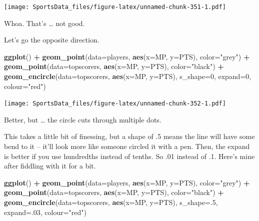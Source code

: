 \documentclass[
]{book}
\newenvironment{Shaded}{\begin{snugshade}}{\end{snugshade}}
\newcommand{\DataTypeTok}[1]{\textcolor[rgb]{0.13,0.29,0.53}{#1}}
\newcommand{\DecValTok}[1]{\textcolor[rgb]{0.00,0.00,0.81}{#1}}
\newcommand{\KeywordTok}[1]{\textcolor[rgb]{0.13,0.29,0.53}{\textbf{#1}}}
\newcommand{\NormalTok}[1]{#1}
\newcommand{\OperatorTok}[1]{\textcolor[rgb]{0.81,0.36,0.00}{\textbf{#1}}}
\newcommand{\StringTok}[1]{\textcolor[rgb]{0.31,0.60,0.02}{#1}}
\begin{document}
\texttt{[image: SportsData\_files/figure-latex/unnamed-chunk-351-1.pdf]}

Whoa. That's \ldots{} not good.

Let's go the opposite direction.

\begin{Shaded}
\begin{Highlighting}[]
\KeywordTok{ggplot}\NormalTok{() }\OperatorTok{+}\StringTok{ }
\StringTok{  }\KeywordTok{geom_point}\NormalTok{(}\DataTypeTok{data=}\NormalTok{players, }\KeywordTok{aes}\NormalTok{(}\DataTypeTok{x=}\NormalTok{MP, }\DataTypeTok{y=}\NormalTok{PTS), }\DataTypeTok{color=}\StringTok{"grey"}\NormalTok{) }\OperatorTok{+}\StringTok{ }
\StringTok{  }\KeywordTok{geom_point}\NormalTok{(}\DataTypeTok{data=}\NormalTok{topscorers, }\KeywordTok{aes}\NormalTok{(}\DataTypeTok{x=}\NormalTok{MP, }\DataTypeTok{y=}\NormalTok{PTS), }\DataTypeTok{color=}\StringTok{"black"}\NormalTok{) }\OperatorTok{+}\StringTok{ }
\StringTok{  }\KeywordTok{geom_encircle}\NormalTok{(}\DataTypeTok{data=}\NormalTok{topscorers, }\KeywordTok{aes}\NormalTok{(}\DataTypeTok{x=}\NormalTok{MP, }\DataTypeTok{y=}\NormalTok{PTS), }\DataTypeTok{s_shape=}\DecValTok{0}\NormalTok{, }\DataTypeTok{expand=}\DecValTok{0}\NormalTok{, }\DataTypeTok{colour=}\StringTok{"red"}\NormalTok{)}
\end{Highlighting}
\end{Shaded}

\texttt{[image: SportsData\_files/figure-latex/unnamed-chunk-352-1.pdf]}

Better, but \ldots{} the circle cuts through multiple dots.

This takes a little bit of finessing, but a shape of .5 means the line will have some bend to it -- it'll look more like someone circled it with a pen. Then, the expand is better if you use hundredths instead of tenths. So .01 instead of .1. Here's mine after fiddling with it for a bit.

\begin{Shaded}
\begin{Highlighting}[]
\KeywordTok{ggplot}\NormalTok{() }\OperatorTok{+}\StringTok{ }
\StringTok{  }\KeywordTok{geom_point}\NormalTok{(}\DataTypeTok{data=}\NormalTok{players, }\KeywordTok{aes}\NormalTok{(}\DataTypeTok{x=}\NormalTok{MP, }\DataTypeTok{y=}\NormalTok{PTS), }\DataTypeTok{color=}\StringTok{"grey"}\NormalTok{) }\OperatorTok{+}\StringTok{ }
\StringTok{  }\KeywordTok{geom_point}\NormalTok{(}\DataTypeTok{data=}\NormalTok{topscorers, }\KeywordTok{aes}\NormalTok{(}\DataTypeTok{x=}\NormalTok{MP, }\DataTypeTok{y=}\NormalTok{PTS), }\DataTypeTok{color=}\StringTok{"black"}\NormalTok{) }\OperatorTok{+}\StringTok{ }
\StringTok{  }\KeywordTok{geom_encircle}\NormalTok{(}\DataTypeTok{data=}\NormalTok{topscorers, }\KeywordTok{aes}\NormalTok{(}\DataTypeTok{x=}\NormalTok{MP, }\DataTypeTok{y=}\NormalTok{PTS), }\DataTypeTok{s_shape=}\NormalTok{.}\DecValTok{5}\NormalTok{, }\DataTypeTok{expand=}\NormalTok{.}\DecValTok{03}\NormalTok{, }\DataTypeTok{colour=}\StringTok{"red"}\NormalTok{)}
\end{Highlighting}
\end{Shaded}
\end{document}
